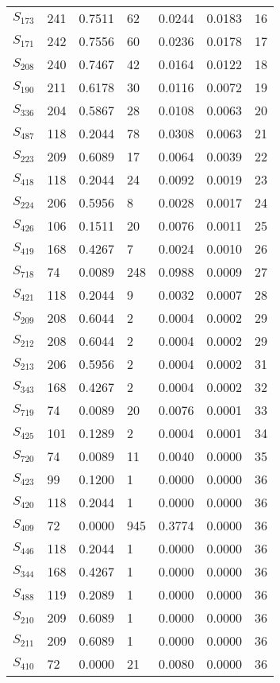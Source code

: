 \begin{xltabular}{\textwidth}{XPPPPPP}
  $S_{173}$ & 241 & 0.7511 & 62 & 0.0244 & 0.0183 & 16 \\ 
  $S_{171}$ & 242 & 0.7556 & 60 & 0.0236 & 0.0178 & 17 \\ 
  $S_{208}$ & 240 & 0.7467 & 42 & 0.0164 & 0.0122 & 18 \\ 
  $S_{190}$ & 211 & 0.6178 & 30 & 0.0116 & 0.0072 & 19 \\ 
  $S_{336}$ & 204 & 0.5867 & 28 & 0.0108 & 0.0063 & 20 \\ 
  $S_{487}$ & 118 & 0.2044 & 78 & 0.0308 & 0.0063 & 21 \\ 
  $S_{223}$ & 209 & 0.6089 & 17 & 0.0064 & 0.0039 & 22 \\ 
  $S_{418}$ & 118 & 0.2044 & 24 & 0.0092 & 0.0019 & 23 \\ 
  $S_{224}$ & 206 & 0.5956 & 8 & 0.0028 & 0.0017 & 24 \\ 
  $S_{426}$ & 106 & 0.1511 & 20 & 0.0076 & 0.0011 & 25 \\ 
  $S_{419}$ & 168 & 0.4267 & 7 & 0.0024 & 0.0010 & 26 \\ 
  $S_{718}$ & 74 & 0.0089 & 248 & 0.0988 & 0.0009 & 27 \\ 
  $S_{421}$ & 118 & 0.2044 & 9 & 0.0032 & 0.0007 & 28 \\ 
  $S_{209}$ & 208 & 0.6044 & 2 & 0.0004 & 0.0002 & 29 \\ 
  $S_{212}$ & 208 & 0.6044 & 2 & 0.0004 & 0.0002 & 29 \\ 
  $S_{213}$ & 206 & 0.5956 & 2 & 0.0004 & 0.0002 & 31 \\ 
  $S_{343}$ & 168 & 0.4267 & 2 & 0.0004 & 0.0002 & 32 \\ 
  $S_{719}$ & 74 & 0.0089 & 20 & 0.0076 & 0.0001 & 33 \\ 
  $S_{425}$ & 101 & 0.1289 & 2 & 0.0004 & 0.0001 & 34 \\ 
  $S_{720}$ & 74 & 0.0089 & 11 & 0.0040 & 0.0000 & 35 \\ 
  $S_{423}$ & 99 & 0.1200 & 1 & 0.0000 & 0.0000 & 36 \\ 
  $S_{420}$ & 118 & 0.2044 & 1 & 0.0000 & 0.0000 & 36 \\ 
  $S_{409}$ & 72 & 0.0000 & 945 & 0.3774 & 0.0000 & 36 \\ 
  $S_{446}$ & 118 & 0.2044 & 1 & 0.0000 & 0.0000 & 36 \\ 
  $S_{344}$ & 168 & 0.4267 & 1 & 0.0000 & 0.0000 & 36 \\ 
  $S_{488}$ & 119 & 0.2089 & 1 & 0.0000 & 0.0000 & 36 \\ 
  $S_{210}$ & 209 & 0.6089 & 1 & 0.0000 & 0.0000 & 36 \\ 
  $S_{211}$ & 209 & 0.6089 & 1 & 0.0000 & 0.0000 & 36 \\ 
  $S_{410}$ & 72 & 0.0000 & 21 & 0.0080 & 0.0000 & 36 \\
        \bottomrule
    \end{xltabular}
    